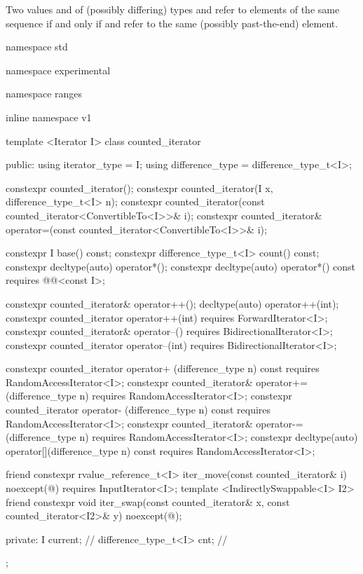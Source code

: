 \pnum
Two values  and  of (possibly differing) types
 and  refer to
elements of the same sequence if and only if 
and  refer to the same (possibly past-the-end) element.

%
\begin{codeblock}
namespace std { namespace experimental { namespace ranges { inline namespace v1 {
  template <Iterator I>
  class counted_iterator {
  public:
    using iterator_type = I;
    using difference_type = difference_type_t<I>;

    constexpr counted_iterator();
    constexpr counted_iterator(I x, difference_type_t<I> n);
    constexpr counted_iterator(const counted_iterator<ConvertibleTo<I>>& i);
    constexpr counted_iterator& operator=(const counted_iterator<ConvertibleTo<I>>& i);

    constexpr I base() const;
    constexpr difference_type_t<I> count() const;
    constexpr decltype(auto) operator*();
    constexpr decltype(auto) operator*() const
      requires @@<const I>;

    constexpr counted_iterator& operator++();
    decltype(auto) operator++(int);
    constexpr counted_iterator operator++(int)
      requires ForwardIterator<I>;
    constexpr counted_iterator& operator--()
      requires BidirectionalIterator<I>;
    constexpr counted_iterator operator--(int)
      requires BidirectionalIterator<I>;

    constexpr counted_iterator  operator+ (difference_type n) const
      requires RandomAccessIterator<I>;
    constexpr counted_iterator& operator+=(difference_type n)
      requires RandomAccessIterator<I>;
    constexpr counted_iterator  operator- (difference_type n) const
      requires RandomAccessIterator<I>;
    constexpr counted_iterator& operator-=(difference_type n)
      requires RandomAccessIterator<I>;
    constexpr decltype(auto) operator[](difference_type n) const
      requires RandomAccessIterator<I>;

    friend constexpr rvalue_reference_t<I> iter_move(const counted_iterator& i)
      noexcept(@\seebelow@)
        requires InputIterator<I>;
    template <IndirectlySwappable<I> I2>
      friend constexpr void iter_swap(const counted_iterator& x, const counted_iterator<I2>& y)
        noexcept(@\seebelow@);

  private:
    I current; // \expos
    difference_type_t<I> cnt; // \expos
  };

}}}}
\end{codeblock}
